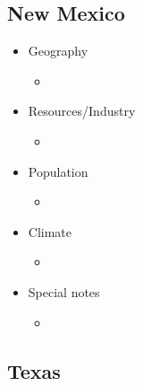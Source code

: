 \documentclass[9pt,twocolumn,twoside]{pnas-new}
\begin{document}
\subsection*{New Mexico}

\begin{itemize}
\item Geography
\begin{itemize}
\item
\end{itemize}

\item Resources/Industry
\begin{itemize}
\item
\end{itemize}

\item Population
\begin{itemize}
\item
\end{itemize}

\item Climate
\begin{itemize}
\item
\end{itemize}

\item Special notes
\begin{itemize}
\item
\end{itemize}

\end{itemize}

\subsection*{Texas}
\end{document}
